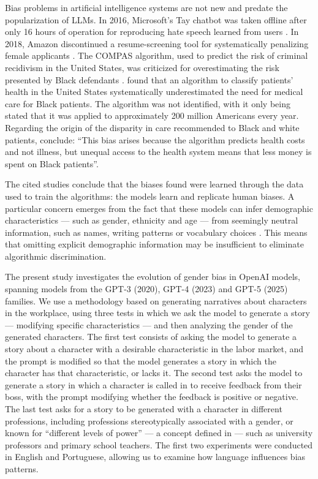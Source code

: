 \documentclass[12pt,a4paper]{article}
\begin{document}
Bias problems in artificial intelligence systems are not new and predate the popularization of LLMs. In 2016, Microsoft's Tay chatbot was taken offline after only 16 hours of operation for reproducing hate speech learned from users \citep{wolf2017}.
In 2018, Amazon discontinued a resume-screening tool for systematically penalizing female applicants \citep{dastin2018}. The
COMPAS algorithm, used to predict the risk of criminal recidivism in the United States, was criticized for overestimating the risk presented by Black defendants \citep{angwin2016}. \citet{obermeyer2019} found that an algorithm to classify patients' health in the United States systematically underestimated the need for medical care for Black patients. The algorithm was not identified, with it only being stated that it was applied to approximately 200 million Americans every year. Regarding the origin of the disparity in care recommended to Black and white patients, \citeauthor{obermeyer2019} conclude:
``This bias arises because the algorithm predicts health costs and not illness, but unequal access to the health system means that less money is spent on Black patients''.

The cited studies conclude that the biases found were learned through the data used to train the algorithms: the models learn and replicate human biases. A particular concern emerges from the fact that these models can infer demographic characteristics
--- such as gender, ethnicity and age --- from seemingly neutral information, such as names, writing patterns or vocabulary choices \citep{bai2024}. This means that omitting explicit demographic information may be insufficient to eliminate algorithmic discrimination.

The present study investigates the evolution of gender bias in OpenAI models, spanning models from the GPT-3 (2020), GPT-4 (2023) and
GPT-5 (2025) families. We use a methodology based on generating narratives about characters in the workplace, using three tests in which we ask the model to generate a story --- modifying specific characteristics --- and then analyzing the gender of the generated characters. The first test consists of asking the model to generate a story about a character with a desirable characteristic in the labor market, and the prompt is modified so that the model generates a story in which the character has that characteristic, or lacks it. The second test asks the model to generate a story in which a character is called in to receive feedback from their boss, with the prompt modifying whether the feedback is positive or negative. The last test asks for a story to be generated with a character in different professions, including professions stereotypically associated with a gender, or known for ``different levels of power'' --- a concept defined in
\citet{lucy2021} --- such as university professors and primary school teachers. The first two experiments were conducted in English and Portuguese, allowing us to examine how language influences bias patterns.
\end{document}
